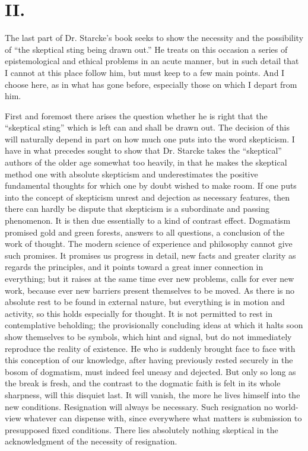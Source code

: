 \documentclass[12pt,a4paper,openany]{book}
\newcommand{\opage}[1]{\marginnote{\footnotesize\textit{[#1]}}}
\begin{document}
\section*{II.}

The last part of Dr. Starcke's book seeks to show
the necessity and the possibility of ``the skeptical sting
being drawn out.'' He treats on this occasion a series of
epistemological and ethical problems in an acute
manner, but in such detail that I cannot at this place
follow him, but must keep to a few main points. And I choose here, as in what has gone before,
especially those on which I depart from him.

First and foremost there arises the question whether he
is right that the ``skeptical sting'' which is left can and
shall be drawn out. The decision of this will naturally depend in
part on how much one puts into the word
skepticism. I have in what precedes sought to show that Dr. Starcke
takes the ``skeptical'' authors of the older age somewhat too heavily,
in that he makes the skeptical method one with absolute
skepticism and underestimates the positive fundamental thoughts for
which one by doubt wished to make room. If one puts into the
concept of skepticism unrest and dejection as
necessary features, then there can hardly be dispute that
skepticism is a subordinate and passing phenomenon.
It is then due essentially to a kind of contrast effect.
Dogmatism promised gold and green forests, answers to all
questions, a conclusion of the work of thought. The modern
science of experience and philosophy cannot give such promises.
It promises us progress in detail, new facts
and greater clarity as regards the principles, and it points
toward a great inner connection in everything; but it raises
at the same time ever new problems, calls for ever new work,
because ever new barriers present themselves to be moved. As
there is no absolute rest to be found in external nature, but everything is
in motion and activity, so this holds especially
\opage{27}for thought. It is not permitted to rest in contemplative
beholding; the provisionally concluding ideas at which it halts
soon show themselves to be symbols, which hint and signal,
but do not immediately reproduce the reality of existence. He
who is suddenly brought face to face with this conception of our
knowledge, after having previously rested securely in the
bosom of dogmatism, must indeed feel uneasy and dejected. But
only so long as the break is fresh, and the contrast to the
dogmatic faith is felt in its whole sharpness, will this
disquiet last. It will vanish, the more he lives himself into
the new conditions. Resignation will always be necessary.
Such resignation no world-view whatever can dispense with,
since everywhere what matters is submission to presupposed
fixed conditions. There lies absolutely nothing skeptical in
the acknowledgment of the necessity of resignation.
\end{document}
